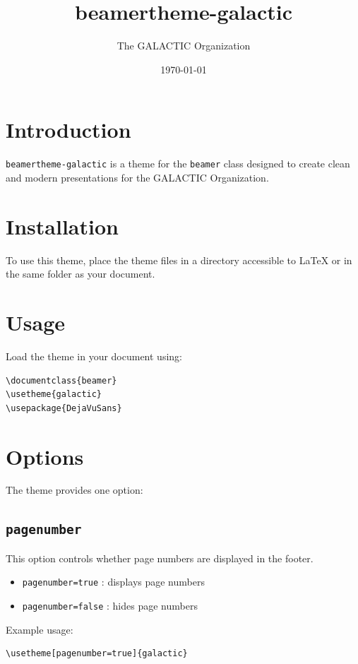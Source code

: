 \documentclass{article}
\title{beamertheme-galactic}
\author{The GALACTIC Organization}
\date{\today}
\begin{document}
\maketitle

\section{Introduction}

\texttt{beamertheme-galactic} is a theme for the \texttt{beamer} class designed to create
clean and modern presentations for the GALACTIC Organization.

\section{Installation}

To use this theme, place the theme files in a directory accessible to \LaTeX{} or in the same folder as your document.

\section{Usage}

Load the theme in your document using:

\begin{verbatim}
\documentclass{beamer}
\usetheme{galactic}
\usepackage{DejaVuSans}
\end{verbatim}

\section{Options}

The theme provides one option:

\subsection{\texttt{pagenumber}}

This option controls whether page numbers are displayed in the footer.

\begin{itemize}
  \item \texttt{pagenumber=true} : displays page numbers
  \item \texttt{pagenumber=false} : hides page numbers
\end{itemize}

Example usage:

\begin{verbatim}
\usetheme[pagenumber=true]{galactic}
\end{verbatim}
\end{document}
